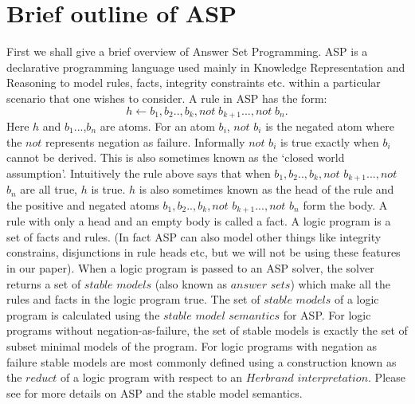 \section{Brief outline of ASP}
First we shall give a brief overview of Answer Set Programming. ASP is a declarative programming language used mainly in Knowledge Representation and Reasoning to model rules, facts, integrity constraints etc. within a particular scenario that one wishes to consider. A rule in ASP has the form:
\[h\leftarrow b_{1},b_{2}..,b_{k},not\; b_{k+1}...,not\; b_{n}.\] Here $h$ and
$b_{1}$...,$b_{n}$ are atoms. For an atom $b_{i}$, $not$ $b_{i}$ is the
negated atom where the $not$ represents negation as failure. Informally $not$
$b_{i}$ is true exactly when $b_{i}$ cannot be derived. This is also sometimes
known as the `closed world assumption'. Intuitively the rule above says that
when $b_{1},b_{2}..,b_{k},not$ $b_{k+1}...,not$ $b_{n}$ are all true, $h$ is
true. $h$ is also sometimes known as the head of the rule and the positive and
negated atoms $b_{1},b_{2}..,b_{k},not$ $b_{k+1}...,not$ $b_{n}$ form the
body. A rule with only a head and an empty body is called a fact. A logic
program is a set of facts and rules. (In fact ASP can also model other things
like integrity constrains, disjunctions in rule heads etc, but we will not be
using these features in our paper). When a logic program is passed to an ASP
solver, the solver returns a set of $stable$ $models$ (also known as $answer$
$sets$) which make all the rules and facts in the logic program true. The set
of $stable$ $models$ of a logic program is calculated using the $stable$
$model$ $semantics$ for ASP. For logic programs without negation-as-failure,
the set of stable models is exactly the set of subset minimal models of the
program. For logic programs with negation as failure stable models are most
commonly defined using a construction known as the $reduct$ of a logic program
with respect to an $Herbrand$ $interpretation$. Please see
\citep{asp_background} for more details on ASP and the stable model semantics.

